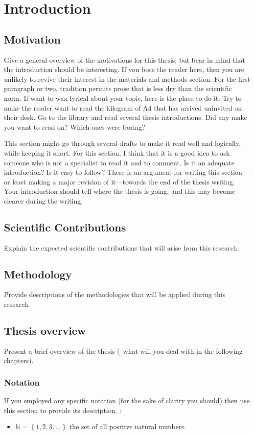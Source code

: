 \graphicspath{{img/}}







\chapter{Introduction}
\label{chap:introduction}


\section{Motivation}
Give a general overview of the motivations for this thesis, but bear in mind that the introduction should be interesting. If you bore the reader here, then you are unlikely to revive their interest in the materials and methods section. For the first paragraph or two, tradition permits prose that is less dry than the scientific norm. If want to wax lyrical about your topic, here is the place to do it. Try to make the reader want to read the kilogram of A4 that has arrived uninvited on their desk. Go to the library and read several thesis introductions. Did any make you want to read on? Which ones were boring? 

This section might go through several drafts to make it read well and logically, while keeping it short. For this section, I think that it is a good idea to ask someone who is not a specialist to read it and to comment. Is it an adequate introduction? Is it easy to follow? There is an argument for writing this section---or least making a major revision of it---towards the end of the thesis writing. Your introduction should tell where the thesis is going, and this may become clearer during the writing. 

\section{Scientific Contributions}
Explain the expected scientific contributions that will arise from this research.

\section{Methodology}
Provide descriptions of the methodologies that will be applied during this research.

\section{Thesis overview}
Present a brief overview of the thesis (\ie~what will you deal with in the following chapters).

\subsection{Notation}
If you employed any specific notation (for the sake of clarity you should) then use this section to provide its description, \eg:
%
\begin{itemize}
\item $\mathbb{N} = \left\{1, 2, 3, \ldots\right\}$ the set of all positive natural numbers.
\end{itemize}
